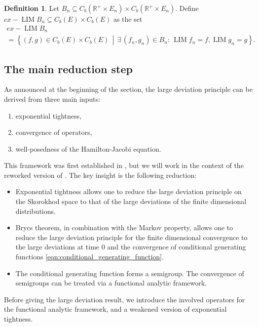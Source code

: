 \documentclass[a4paper]{article}
\newcommand{\bR}{\mathbb{R}}
\DeclareMathOperator*{\LIM}{LIM}
\numberwithin{equation}{section}
\theoremstyle{definition}
\newtheorem{definition}[theorem]{Definition}
\begin{document}
\begin{definition}
	Let $B_n \subseteq C_b(\bR^+ \times E_n) \times C_b(\bR^+ \times E_n)$. Define $ex-\LIM B_n \subseteq C_b(E) \times C_b(E)$ as the set
	\begin{multline*}
		ex-\LIM B_n \\
		= \left\{(f,g) \in C_b(E) \times C_b(E) \, \middle| \, \exists \, (f_n,g_n) \in B_n: \, \LIM f_n = f, \LIM g_n = g \right\}.
	\end{multline*}
\end{definition}


\subsection{The main reduction step} \label{section:reduction_LDP_to_HJ_intuition}

As announced at the beginning of the section, the large deviation principle can be derived from three main inputs:
\begin{enumerate}
	\item exponential tightness,
	\item convergence of operators,
	\item well-posedness of the Hamilton-Jacobi equation.
\end{enumerate}

This framework was first established in \cite[Theorem 7.18]{FK06}, but we will work in the context of the reworked version of \cite[Theorem 7.10]{Kr19c}. The key insight is the following reduction:
\begin{itemize}
	\item Exponential tightness allows one to reduce the large deviation principle on the Skorokhod space to that of the large deviations of the finite dimensional distributions.
	\item Brycs theorem, in combination with the Markov property, allows one to reduce the large deviation principle for the finite dimensional convergence to the large deviations at time $0$ and the convergence of conditional generating functions \eqref{eqn:conditional_generating_function}. 
	\item The conditional generating function forms a semigroup. The convergence of semigroups can be treated via a functional analytic framework.
\end{itemize}

Before giving the large deviation result, we introduce the involved operators for the functional analytic framework, and a weakened version of exponential tightness.
\end{document}
